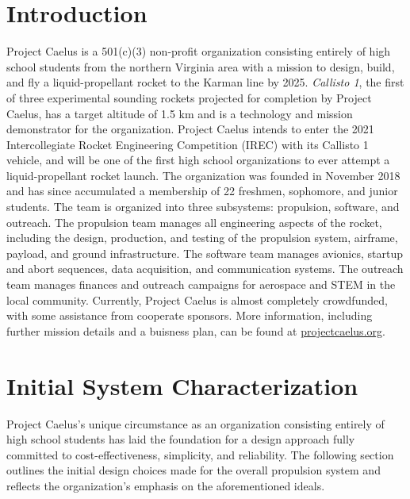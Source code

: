 \documentclass[9pt]{article} %
\numberwithin{equation}{section} %
\begin{document}
\section{Introduction}
\hspace{\parindent} Project Caelus is a 501(c)(3) non-profit organization consisting entirely of high school students from the northern Virginia area with a mission to design, build, and fly a liquid-propellant rocket to the Karman line by 2025. \textit{Callisto 1}, the first of three experimental sounding rockets projected for completion by Project Caelus, has a target altitude of 1.5 km and is a technology and mission demonstrator for the organization. Project Caelus intends to enter the 2021 Intercollegiate Rocket Engineering Competition (IREC) with its Callisto 1 vehicle, and will be one of the first high school organizations to ever attempt a liquid-propellant rocket launch. The organization was founded in November 2018 and has since accumulated a membership of 22 freshmen, sophomore, and junior students. The team is organized into three subsystems: propulsion, software, and outreach. The propulsion team manages all engineering aspects of the rocket, including the design, production, and testing of the propulsion system, airframe, payload, and ground infrastructure. The software team manages avionics, startup and abort sequences, data acquisition, and communication systems. The outreach team manages finances and outreach campaigns for aerospace and STEM in the local community. Currently, Project Caelus is almost completely crowdfunded, with some assistance from cooperate sponsors. More information, including further mission details and a buisness plan, can be found at \url{projectcaelus.org}.

\section{Initial System Characterization}
\hspace{\parindent} Project Caelus's unique circumstance as an organization consisting entirely of high school students has laid the foundation for a design approach fully committed to cost-effectiveness, simplicity, and reliability. The following section outlines the initial design choices made for the overall propulsion system and reflects the organization's emphasis on the aforementioned ideals.
\end{document}
